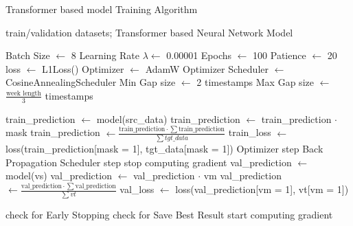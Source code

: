 \begin{algorithm}[H]
	\caption{Transformer based model Training Algorithm}\label{alg:gabtraining}
	\begin{algorithmic}
		\Require train/validation datasets; Transformer based Neural Network Model

		\State Batch Size $\gets$ 8
		\State Learning Rate $\lambda \gets$ 0.00001
		\State Epochs $\gets$ 100
		\State Patience $\gets$ 20
		\State loss $\gets$ L1Loss()
		\State Optimizer $\gets$ AdamW Optimizer
		\State Scheduler $\gets$ CosineAnnealingScheduler
		\State Min Gap size $\gets$ 2 timestamps
		\State Max Gap size $\gets$ $\frac{\text{week length}}{3}$ timestamps
		\State

		\State train\_prediction $\gets$ model(src\_data) 
		\State train\_prediction $\gets$ train\_prediction $\cdot$ mask
		\State train\_prediction $\gets \frac{\text{train\_prediction} \cdot \sum\text{train\_prediction}}{\sum tgt\_data}$ 
		\State train\_loss $\gets$ loss(train\_prediction[mask = 1], tgt\_data[mask = 1])
		\State Optimizer step
		\State Back Propagation
		\EndFor
		\State Scheduler step
		\State stop computing gradient
		\State val\_prediction $\gets$ model(vs) 
		\State val\_prediction $\gets$ val\_prediction $\cdot$ vm
		\State val\_prediction $\gets \frac{\text{val\_prediction} \cdot \sum\text{val\_prediction}}{\sum vt}$ 
		\State val\_loss $\gets$ loss(val\_prediction[vm = 1], vt[vm = 1])
		\EndFor

		\State check for Early Stopping
		\State check for Save Best Result
		\State start computing gradient
		\EndFor
	\end{algorithmic}
\end{algorithm}
